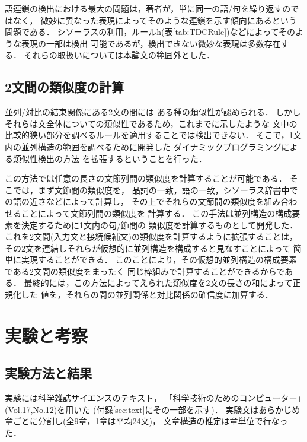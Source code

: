 語連鎖の検出における最大の問題は，著者が，単に同一の語/句を繰り返すのではなく，
微妙に異なった表現によってそのような連鎖を示す傾向にあるという問題である．
シソーラスの利用，ルールh(表\ref{tab:TDCRule})などによってそのような表現の一部は検出
可能であるが，検出できない微妙な表現は多数存在する．
それらの取扱いについては本論文の範囲外とした．

\subsection{2文間の類似度の計算}

並列/対比の結束関係にある2文の間には
ある種の類似性が認められる．
しかしそれらは文全体についての類似性であるため，これまでに示したような
文中の比較的狭い部分を調べるルールを適用することでは検出できない．
そこで，1文内の並列構造の範囲を調べるために開発した
ダイナミックプログラミングによる類似性検出の方法
\cite{KurohashiAndNagao1992b}
を拡張するということを行った．

この方法では任意の長さの文節列間の類似度を計算することが可能である．
そこでは，まず文節間の類似度を，
品詞の一致，語の一致，シソーラス辞書中での語の近さなどによって計算し，
その上でそれらの文節間の類似度を組み合わせることによって文節列間の類似度を
計算する．
この手法は並列構造の構成要素を決定するために1文内の句/節間の
類似度を計算するものとして開発した．
これを2文間(入力文と接続候補文)の類似度を計算するように拡張することは，
その2文を連結しそれらが仮想的に並列構造を構成すると見なすことによって
簡単に実現することができる．
このことにより，その仮想的並列構造の構成要素である2文間の類似度をまったく
同じ枠組みで計算することができるからである．
最終的には，この方法によってえられた類似度を2文の長さの和によって正規化した
値を，それらの間の並列関係と対比関係の確信度に加算する．


\section{実験と考察}

\subsection{実験方法と結果}

実験には科学雑誌サイエンスのテキスト，
「科学技術のためのコンピューター」(Vol.17,No.12)を用いた
(付録\ref{sec:text}にその一部を示す)．
実験文はあらかじめ章ごとに分割し(全9章，1章は平均24文)，
文章構造の推定は章単位で行なった．

